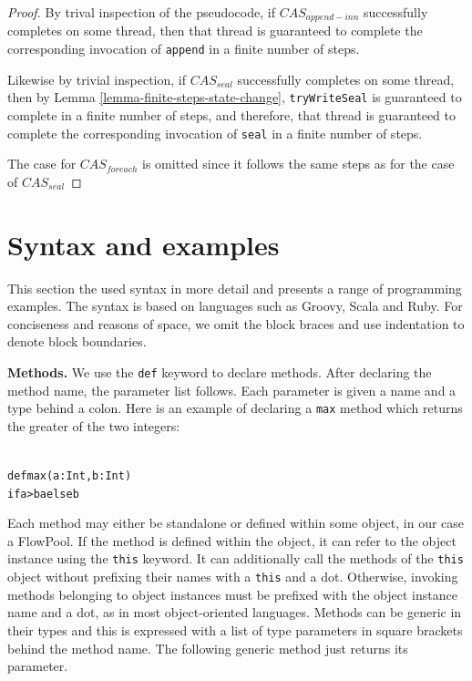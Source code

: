 \documentclass[runningheads,a4paper]{llncs}
\begin{document}
\begin{proof}

By trival inspection of the pseudocode, if $CAS_{append-inn}$ successfully
completes on some thread, then that thread is guaranteed to complete the
corresponding invocation of \verb=append= in a finite number of steps. 


Likewise by trivial inspection, if $CAS_{seal}$ successfully completes on some
thread, then by Lemma \ref{lemma-finite-steps-state-change},
\verb=tryWriteSeal= is guaranteed to complete in a finite number of steps, and
therefore, that thread is guaranteed to complete the corresponding invocation
of \verb=seal= in a finite number of steps.

The case for $CAS_{foreach}$ is omitted since it follows the same steps as for the case
of $CAS_{seal}$
\end{proof}


\section{Syntax and examples}

This section the used syntax in more detail and presents a range of programming
examples.
The syntax is based on languages such as Groovy, Scala and Ruby.
For conciseness and reasons of space, we omit the block braces and use indentation
to denote block boundaries.

\textbf{Methods.}
We use the \verb=def= keyword to declare methods.
After declaring the method name, the parameter list follows.
Each parameter is given a name and a type behind a colon.
Here is an example of declaring a \verb=max= method which returns the greater
of the two integers:

\begin{minipage}[b]{3.75 cm}
\begin{alltt}
{\scriptsize
def max(a: Int, b: Int)
  if a > b a else b
}
\end{alltt}
\end{minipage}


Each method may either be standalone or defined within some object, in our case
a FlowPool.
If the method is defined within the object, it can refer to the object instance
using the \verb=this= keyword.
It can additionally call the methods of the \verb=this= object without prefixing
their names with a \verb=this= and a dot.
Otherwise, invoking methods belonging to object instances must be prefixed with
the object instance name and a dot, as in most object-oriented languages.
Methods can be generic in their types and this is expressed with a list of
type parameters in square brackets behind the method name.
The following generic method just returns its parameter.
\end{document}
